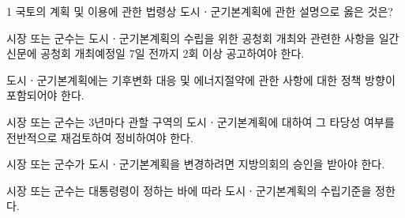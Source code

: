 \begin{question}{1}
국토의 계획 및 이용에 관한 법령상 도시ㆍ군기본계획에 관한 설명으로 옳은 것은?
\begin{choices}
  \item 시장 또는 군수는 도시ㆍ군기본계획의 수립을 위한 공청회 개최와 관련한 사항을 일간신문에 공청회 개최예정일 7일 전까지 2회 이상 공고하여야 한다.
  \item 도시ㆍ군기본계획에는 기후변화 대응 및 에너지절약에 관한 사항에 대한 정책 방향이 포함되어야 한다.
  \item 시장 또는 군수는 3년마다 관할 구역의 도시ㆍ군기본계획에 대하여 그 타당성 여부를 전반적으로 재검토하여 정비하여야 한다.
  \item 시장 또는 군수가 도시ㆍ군기본계획을 변경하려면 지방의회의 승인을 받아야 한다.
  \item 시장 또는 군수는 대통령령이 정하는 바에 따라 도시ㆍ군기본계획의 수립기준을 정한다.
\end{choices}
\end{question}
